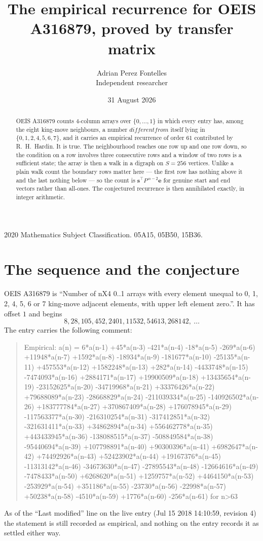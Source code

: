 \documentclass[11pt,a4paper]{article}
\title{The empirical recurrence for OEIS A316879, proved by transfer matrix}
\author{Adrian Perez Fontelles\\ \small Independent researcher}
\date{31 August 2026}
\theoremstyle{plain}
\theoremstyle{definition}
\begin{document}
\maketitle

\begin{abstract}
OEIS A316879 counts $4$-column arrays over $\{0,\dots,1\}$ in which every entry has,
among the eight king-move neighbours, a number $different from$ itself lying in $\{0,1,2,4,5,6,7\}$, and it carries an empirical
recurrence of order $61$ contributed by R.~H.~Hardin. It is true. The neighbourhood
reaches one row up and one row down, so the condition on a row involves three consecutive
rows and a window of two rows is a sufficient state; the array is then a walk in a digraph
on $S=256$ vertices. Unlike a plain walk count the boundary rows matter here --- the first
row has nothing above it and the last nothing below --- so the count is
$\mathbf{s}^{\!\top}P^{\,n-2}\mathbf{e}$ for genuine start and end vectors rather than
all-ones. The conjectured recurrence is then annihilated exactly, in integer arithmetic.
\end{abstract}

\noindent\small 2020 Mathematics Subject Classification. 05A15, 05B50, 15B36.\normalsize

\section{The sequence and the conjecture}

OEIS A316879 is ``Number of nX4 0..1 arrays with every element unequal to 0, 1, 2, 4, 5, 6 or 7 king-move adjacent elements, with upper left element zero.''. It has offset
$1$ and begins
\[
8, 28, 105, 452, 2401, 11532, 54613, 268142,\ \dots
\]
The entry carries the following comment:
\begin{quote}\small
Empirical: a(n) = 6*a(n-1) +45*a(n-3) -421*a(n-4) -18*a(n-5) -269*a(n-6) +11948*a(n-7) +1592*a(n-8) -18934*a(n-9) -181677*a(n-10) -25135*a(n-11) +457553*a(n-12) +1582248*a(n-13) +282*a(n-14) -4433748*a(n-15) -7474093*a(n-16) +2884171*a(n-17) +19900509*a(n-18) +13435654*a(n-19) -23152625*a(n-20) -34719968*a(n-21) +33376426*a(n-22) +79688089*a(n-23) -28668829*a(n-24) -211039334*a(n-25) -140926502*a(n-26) +183777784*a(n-27) +370867409*a(n-28) +176078945*a(n-29) -117563377*a(n-30) -216310254*a(n-31) -317412851*a(n-32) -321631411*a(n-33) +34862894*a(n-34) +556462778*a(n-35) +443433945*a(n-36) -138088515*a(n-37) -508849584*a(n-38) -95440694*a(n-39) +107798891*a(n-40) +90300396*a(n-41) +6982647*a(n-42) +74492926*a(n-43) +52423902*a(n-44) +19167376*a(n-45) -11313142*a(n-46) -34673630*a(n-47) -27895543*a(n-48) -12664616*a(n-49) -7478433*a(n-50) +6268620*a(n-51) +1259757*a(n-52) +4464150*a(n-53) -253929*a(n-54) +351186*a(n-55) -23730*a(n-56) -22998*a(n-57) +50238*a(n-58) -4510*a(n-59) +1776*a(n-60) -256*a(n-61) for n>63
\end{quote}
As of the ``Last modified'' line on the live entry (Jul 15 2018 14:10:59, revision
4) the statement is still recorded as empirical, and nothing on the entry
records it as settled either way.
\end{document}
